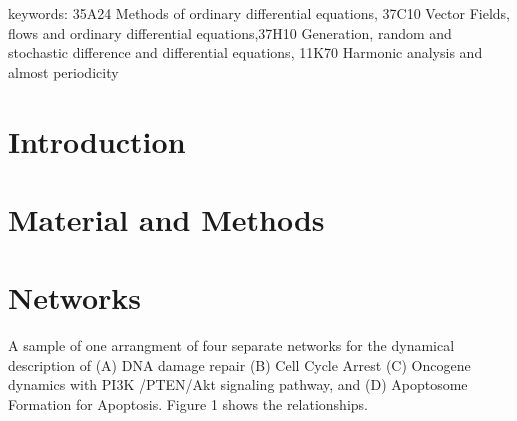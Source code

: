 \documentclass[preprint, 8pt]{elsarticle}
\theoremstyle{definition}
\begin{document}
	
keywords: 35A24 Methods of ordinary differential equations, 37C10 Vector Fields, flows and ordinary differential equations,37H10 Generation, random and stochastic difference and differential equations, 11K70 Harmonic analysis and almost periodicity

\section{Introduction}

\begin{enumerate}
\end{enumerate}

\section{Material and Methods}

\section{Networks}

A sample of one arrangment of four separate networks for the dynamical description of (A) DNA damage repair (B) Cell Cycle Arrest  (C) Oncogene dynamics with PI3K /PTEN/Akt signaling pathway, and (D) Apoptosome Formation for Apoptosis. Figure 1 shows the relationships. 
\end{document}
